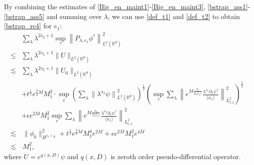 \documentclass[10pt,twoside,a4paper]{article}
\numberwithin{equation}{section}\allowdisplaybreaks
\def\leq{\leqslant}
\begin{document}
By combining the estimates of  \eqref{Big_en_maint1}-\eqref{Big_en_maint3},  \eqref{bstrap_ass1}-\eqref{bstrap_ass5} and summing over $ \lambda $,   we can use  \eqref{def_t1}  and \eqref{def_t2} to obtain \eqref{bstrap_re4} for $ e_1$: 
\begin{align*}
	&	\sum_{\lambda} \lambda^{2s_2+1} \sup_{\tau}\left\| P_{\lambda, e_1}  \phi^\tau\right\|_{L^2(\mathbb{R}^d)}^2\\
	\leq  &     \sum_{\lambda} \lambda^{2s_2+1}		\|U\|_{L^{2}(\mathbb{R}^d)}\nonumber\\
	\lesssim   & \sum_{\lambda} \lambda^{2s_2+1}		\|U_0\|_{L^{2}(\mathbb{R}^d)} \nonumber\\
	&+t^{\frac12} e^{\frac 32M} M_1^2 \cdot \sup_{t }\left(\sum_{\lambda}\left\| \lambda^{s_2} \psi\right\|_{L^{2}(\mathbb{R}^d)}^2 \right)^{\frac 12} \left(\sup_{\tau}  \sum_{\lambda} \left\| e^{M \frac{x_1}{2\langle x_1\rangle} }  \frac{\lambda^{s_2} \partial_1 \psi^{\tau }}{\langle x_1\rangle } \right\|_{L^2_{t,x}}^2\right)^{\frac 12}\nonumber\\
	&+\epsilon e^{ 2M} M_1^2  \sup_{\tau}  \sum_{\lambda}   \left\| e^{M \frac{x_k}{2\langle x_1\rangle} }  \frac{\lambda^{s_2} \partial_1 \psi^{\tau }}{\langle x_1\rangle } \right\|_{L^2_{t,x}}^2 \nonumber\\
	\lesssim & \,   \|\phi_0\|_{H^{s_2+\frac 12}}^2+t^{\frac 12 }  e^{\frac 32 M}  M_1^4 e^{2M}  + \epsilon e^{ 2M} M_1^2  e^{4M}  \nonumber\\
	\lesssim &\, M_1^2,\nonumber
\end{align*}
where  $ U= e^{q (x,D)} \psi $ and $ q (x,D)$ is zeroth order pseudo-differential operator.
\end{document}
